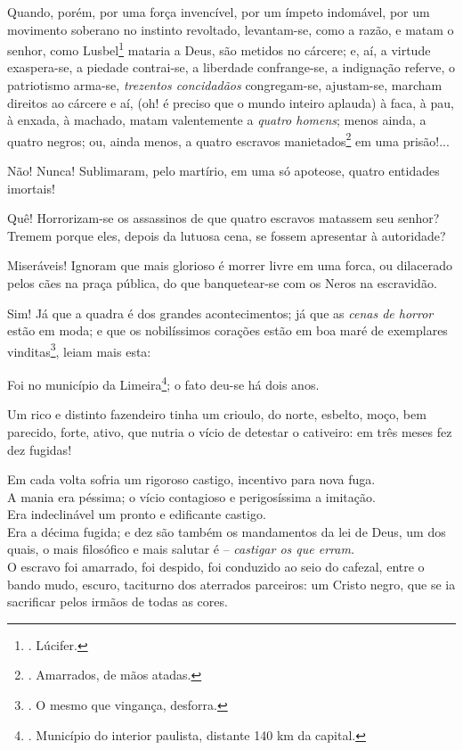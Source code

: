Quando, porém, por uma força invencível, por um ímpeto indomável, por um
movimento soberano no instinto revoltado, levantam-se, como a razão, e
matam o senhor, como Lusbel\footnote{. Lúcifer.} mataria a Deus, são
metidos no cárcere; e, aí, a virtude exaspera-se, a piedade contrai-se,
a liberdade confrange-se, a indignação referve, o patriotismo arma-se,
\emph{trezentos concidadãos} congregam-se, ajustam-se, marcham direitos
ao cárcere e aí, (oh! é preciso que o mundo inteiro aplauda) à faca, à
pau, à enxada, à machado, matam valentemente a \emph{quatro homens};
menos ainda, a quatro negros; ou, ainda menos, a quatro escravos
manietados\footnote{. Amarrados, de mãos atadas.} em uma prisão!...

Não! Nunca! Sublimaram, pelo martírio, em uma só apoteose, quatro
entidades imortais!

Quê! Horrorizam-se os assassinos de que quatro escravos matassem seu
senhor? Tremem porque eles, depois da lutuosa cena, se fossem apresentar
à autoridade?

Miseráveis! Ignoram que mais glorioso é morrer livre em uma forca, ou
dilacerado pelos cães na praça pública, do que banquetear-se com os
Neros na escravidão.

Sim! Já que a quadra é dos grandes acontecimentos; já que as \emph{cenas
de horror} estão em moda; e que os nobilíssimos corações estão em boa
maré de exemplares vinditas\footnote{. O mesmo que vingança, desforra.},
leiam mais esta:

Foi no município da Limeira\footnote{. Município do interior paulista,
  distante 140 km da capital.}; o fato deu-se há dois anos.

Um rico e distinto fazendeiro tinha um crioulo, do norte, esbelto, moço,
bem parecido, forte, ativo, que nutria o vício de detestar o cativeiro:
em três meses fez dez fugidas!

Em cada volta sofria um rigoroso castigo, incentivo para nova fuga.\\
A mania era péssima; o vício contagioso e perigosíssima a imitação.\\
Era indeclinável um pronto e edificante castigo.\\
Era a décima fugida; e dez são também os mandamentos da lei de Deus, um
dos quais, o mais filosófico e mais salutar é -- \emph{castigar os que
erram.\\
} O escravo foi amarrado, foi despido, foi conduzido ao seio do cafezal,
entre o bando mudo, escuro, taciturno dos aterrados parceiros: um Cristo
negro, que se ia sacrificar pelos irmãos de todas as cores.


